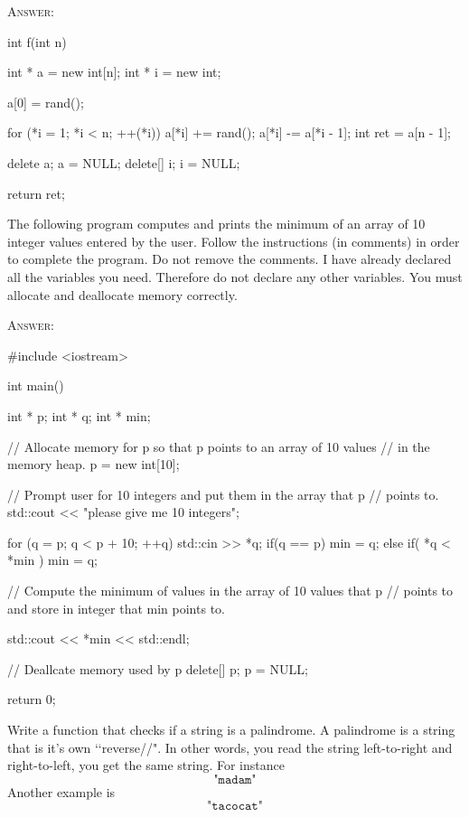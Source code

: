 \textsc{Answer:}
\begin{answercode}
int f(int n)
{
    int * a = new int[n];
    int * i = new int;

    a[0] = rand();

    for (*i = 1; *i < n; ++(*i))
    {
        a[*i] += rand();
        a[*i] -= a[*i - 1];
    }
    int ret = a[n - 1];

    delete a;
    a = NULL;
    delete[] i;
    i = NULL;

    return ret;
}
\end{answercode}


\newpage
\nextq
The following program computes and prints the minimum of an array of 10 integer
values entered by the user.
Follow the instructions (in comments) in order to complete the program.
Do not remove the comments.
I have already declared all the variables you need.
Therefore do not declare any other variables.
You must allocate and deallocate memory correctly.

\textsc{Answer:}
\begin{answercode}
#include <iostream>

int main()
{
    int * p;
    int * q;
    int * min; 

    // Allocate memory for p so that p points to an array of 10 values
    // in the memory heap.
    p = new int[10];

    // Prompt user for 10 integers and put them in the array that p
    // points to.
    std::cout << "please give me 10 integers\n";

    for (q = p; q < p + 10; ++q)
    {
        std::cin >> *q;
        if(q == p)
             min = q;
        else if( *q < *min )
             min = q;
    }

    // Compute the minimum of values in the array of 10 values that p
    // points to and store in integer that min points to.
    

    std::cout << *min << std::endl;

    // Deallcate memory used by p
    delete[] p;
    p = NULL;
    
    return 0;
}
\end{answercode}


\newpage
\nextq
Write a function that checks if a string is a palindrome.
A palindrome is a string that is it’s own \lq\lq reverse//".
In other words, you read the string left-to-right and right-to-left,
you get the same string. For instance
\[
	\texttt{"madam"}
\]
Another example is 
\[
	\texttt{"tacocat"}
\]


